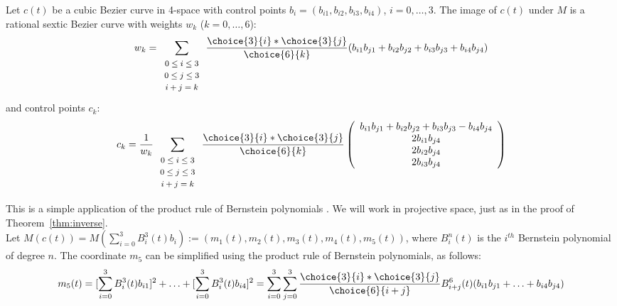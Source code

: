 \begin{theorem}
\label{sextic}
Let $c(t)$ be a cubic Bezier curve in 4-space with
control points $b_i = (b_{i1},b_{i2},b_{i3},b_{i4})$, $i=0,\ldots,3$.
The image of $c(t)$ under $M$ is a rational sextic Bezier curve with 
weights $w_k$ ($k = 0, \ldots, 6$):
\begin{equation}
\label{eq:weights}
w_k = \sum_{\begin{array}{c} \mbox{\footnotesize{$0 \leq i \leq 3$}} \\ 
			     \mbox{\footnotesize{$0 \leq j \leq 3$}} \\ 
			     \mbox{\footnotesize{$i+j=k$}}
			     \end{array}}
        \frac{\choice{3}{i} * \choice{3}{j}}{\choice{6}{k}}
	(b_{i1} b_{j1} + b_{i2} b_{j2} + b_{i3} b_{j3} + b_{i4} b_{j4})
\end{equation}
and control points $c_k$:
\begin{equation}
\label{eq:control-pts}
c_k = \frac{1}{w_k} 
      \sum_{\begin{array}{c} \mbox{\footnotesize{$0 \leq i \leq 3$}} \\ 
			     \mbox{\footnotesize{$0 \leq j \leq 3$}} \\ 
			     \mbox{\footnotesize{$i+j=k$}}
			     \end{array}} 
        \frac{\choice{3}{i} * \choice{3}{j}}{\choice{6}{k}}
	\left( \begin{array}{c}
            b_{i1} b_{j1} + b_{i2} b_{j2} + b_{i3} b_{j3} - b_{i4} b_{j4} \\
            2b_{i1} b_{j4} \\
            2b_{i2} b_{j4} \\
            2b_{i3} b_{j4} 
	\end{array} \right)
\end{equation}
\end{theorem}
\prf
This is a simple application of the product rule of Bernstein polynomials
\cite{farin97}.
We will work in projective space, just as in the proof of 
Theorem~\ref{thm:inverse}.\\
Let $M(c(t)) = M(\sum_{i=0}^3 B_i^3(t) b_{i}) 
:= (m_1(t),m_2(t),m_3(t),m_4(t),m_5(t))$, 
where $B_i^n(t)$ is the $i^{th}$ Bernstein polynomial of degree $n$.
The coordinate $m_5$ can be simplified using the product rule 
of Bernstein polynomials, as follows:
\[ m_5(t) =  [\sum_{i=0}^3 B_i^3(t) b_{i1}]^2 + 
	\ldots + [\sum_{i=0}^3 B_i^3(t) b_{i4}]^2
     =   \sum_{i=0}^3 \sum_{j=0}^3 
	\frac{\choice{3}{i} * \choice{3}{j}}{\choice{6}{i+j}}
       B^6_{i+j}(t) (b_{i1} b_{j1} + \ldots + b_{i4} b_{j4})
\]
